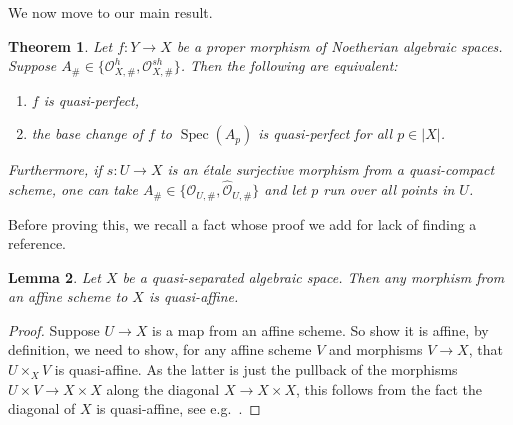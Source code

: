 \documentclass[11pt]{amsart}
\theoremstyle{plain}
\newtheorem{theorem}{Theorem}[section]
\newtheorem{lemma}[theorem]{Lemma}
\theoremstyle{definition}
\numberwithin{equation}{section}
\numberwithin{theorem}{section}
\begin{document}
We now move to our main result.

\begin{theorem}
    \label{thm:quasi-perfectness_locality}
    Let $f\colon Y\to X$ be a proper morphism of Noetherian algebraic spaces. Suppose $A_\# \in \{\mathcal{O}_{X,\#}^h, \mathcal{O}_{X,\#}^{sh} \}$. 
    Then the following are equivalent:
    \begin{enumerate}
       \item\label{item1} $f$ is quasi-perfect,
       \item\label{item2} the base change of $f$ to $\operatorname{Spec}(A_p)$ is quasi-perfect for all $p \in |X|$.
    \end{enumerate}
    Furthermore, if $s\colon U\to X$ is an \'{e}tale surjective morphism from a quasi-compact scheme, one can take $A_\# \in \{ \mathcal{O}_{U,\#}, \widehat{\mathcal{O}}_{U,\#}\}$
    and let $p$ run over all points in $U$.
\end{theorem}

Before proving this, we recall a fact whose proof we add for lack of finding a reference.

\begin{lemma}
    \label{lem:affine_to_qs_space_is_quasi-affine_morphism}
    Let $X$ be a quasi-separated algebraic space. Then any morphism from an affine scheme to $X$ is quasi-affine.
\end{lemma}

\begin{proof}
    Suppose $U\to X$ is a map from an affine scheme. So show it is affine, by definition, we need to show, for any affine scheme $V$ and morphisms $V\to X$, that $U\times_X V $ is quasi-affine.
    As the latter is just the pullback of the morphisms $U\times V\to X\times X$ along the diagonal $X\to X\times X$, this follows from the fact the diagonal of $X$ is quasi-affine, see e.g.\ \cite[\href{https://stacks.math.columbia.edu/tag/03HK}{Tag 03HK} \& \href{https://stacks.math.columbia.edu/tag/02LR}{Tag 02LR}]{StacksProject}. \qedhere
\end{proof}
\end{document}
